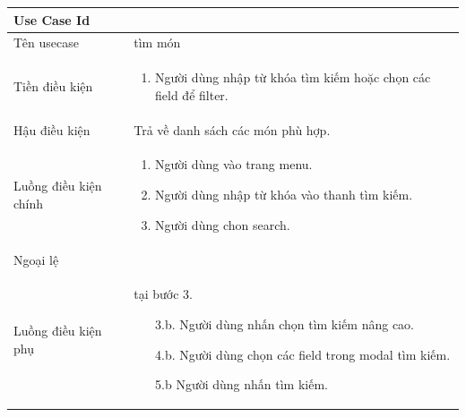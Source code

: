 \begin{center}

    \begin{tabular}{|p{5cm}|p{7cm}|} 
        \hline
        \textbf{Use Case Id} & \textbf{}  \\ \hline
        Tên usecase &  tìm món\\ \hline
        Tiền điều kiện &    \begin{enumerate}
            \item Người dùng nhập từ khóa tìm kiếm hoặc chọn các field để filter.
        \end{enumerate}\\ \hline
        Hậu điều kiện & Trả về danh sách các món phù hợp.\\ \hline
        Luồng điều kiện chính &  
            \begin{enumerate}
                \item Người dùng vào trang menu.
                \item Người dùng nhập từ khóa vào thanh tìm kiếm.
     			\item Người dùng chon search.
            \end{enumerate}\\
        \hline
        Ngoại lệ &  \\ \hline
        Luồng điều kiện phụ &  tại bước 3.
            \begin{enumerate}[start = 3]
                \item[3.b.] Người dùng nhấn chọn tìm kiếm nâng cao.
                \item[4.b.] Người dùng chọn các field trong modal tìm kiếm.
                \item[5.b] Người dùng nhấn tìm kiếm.   
             \end{enumerate}\\
    \hline
    \end{tabular}
\end{center}

